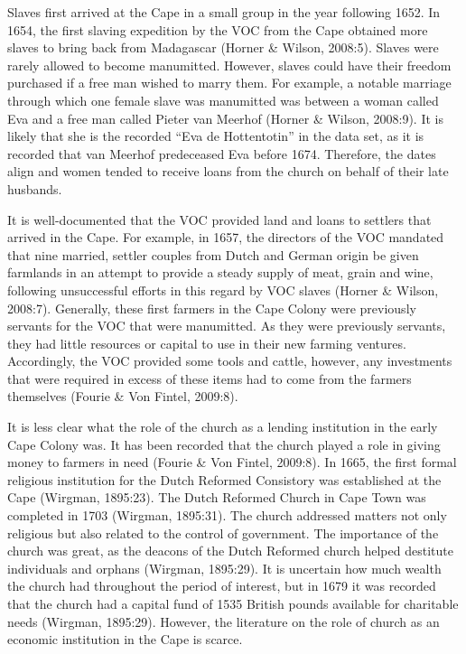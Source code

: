 \documentclass[11pt,preprint, authoryear]{elsarticle}
\numberwithin{equation}{section}
\numberwithin{figure}{section}
\numberwithin{table}{section}
\begin{document}
Slaves first arrived at the Cape in a small group in the year following
1652. In 1654, the first slaving expedition by the VOC from the Cape
obtained more slaves to bring back from Madagascar (Horner \& Wilson,
2008:5). Slaves were rarely allowed to become manumitted. However,
slaves could have their freedom purchased if a free man wished to marry
them. For example, a notable marriage through which one female slave was
manumitted was between a woman called Eva and a free man called Pieter
van Meerhof (Horner \& Wilson, 2008:9). It is likely that she is the
recorded ``Eva de Hottentotin'' in the data set, as it is recorded that
van Meerhof predeceased Eva before 1674. Therefore, the dates align and
women tended to receive loans from the church on behalf of their late
husbands.

It is well-documented that the VOC provided land and loans to settlers
that arrived in the Cape. For example, in 1657, the directors of the VOC
mandated that nine married, settler couples from Dutch and German origin
be given farmlands in an attempt to provide a steady supply of meat,
grain and wine, following unsuccessful efforts in this regard by VOC
slaves (Horner \& Wilson, 2008:7). Generally, these first farmers in the
Cape Colony were previously servants for the VOC that were manumitted.
As they were previously servants, they had little resources or capital
to use in their new farming ventures. Accordingly, the VOC provided some
tools and cattle, however, any investments that were required in excess
of these items had to come from the farmers themselves (Fourie \& Von
Fintel, 2009:8).

It is less clear what the role of the church as a lending institution in
the early Cape Colony was. It has been recorded that the church played a
role in giving money to farmers in need (Fourie \& Von Fintel, 2009:8).
In 1665, the first formal religious institution for the Dutch Reformed
Consistory was established at the Cape (Wirgman, 1895:23). The Dutch
Reformed Church in Cape Town was completed in 1703 (Wirgman, 1895:31).
The church addressed matters not only religious but also related to the
control of government. The importance of the church was great, as the
deacons of the Dutch Reformed church helped destitute individuals and
orphans (Wirgman, 1895:29). It is uncertain how much wealth the church
had throughout the period of interest, but in 1679 it was recorded that
the church had a capital fund of 1535 British pounds available for
charitable needs (Wirgman, 1895:29). However, the literature on the role
of church as an economic institution in the Cape is scarce.
\end{document}
